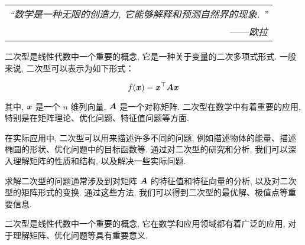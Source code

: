 \begin{flushright}
    \begin{tabular}{r||}
        \textit{“数学是一种无限的创造力, 它能够解释和预测自然界的现象. ”}\\
        ——\textit{欧拉}
    \end{tabular}
\end{flushright}

二次型是线性代数中一个重要的概念, 它是一种关于变量的二次多项式形式. 一般来说, 二次型可以表示为如下形式：

$$
f(\vb*{x})=\vb*{x}^\top\vb*{Ax}
$$

其中, $\vb*{x}$ 是一个 $n$ 维列向量, $\vb*{A}$ 是一个对称矩阵. 二次型在数学中有着重要的应用, 特别是在矩阵理论、优化问题、特征值问题等方面. 

在实际应用中, 二次型可以用来描述许多不同的问题, 例如描述物体的能量、描述椭圆的形状、优化问题中的目标函数等. 通过对二次型的研究和分析, 我们可以深入理解矩阵的性质和结构, 以及解决一些实际问题. 

求解二次型的问题通常涉及到对矩阵 $\vb*{A}$ 的特征值和特征向量的分析, 以及对二次型的矩阵形式的变换. 通过这些方法, 我们可以得到二次型的最优解、极值点等重要信息. 

二次型是线性代数中一个重要的概念, 它在数学和应用领域都有着广泛的应用, 对于理解矩阵、优化问题等具有重要意义. 